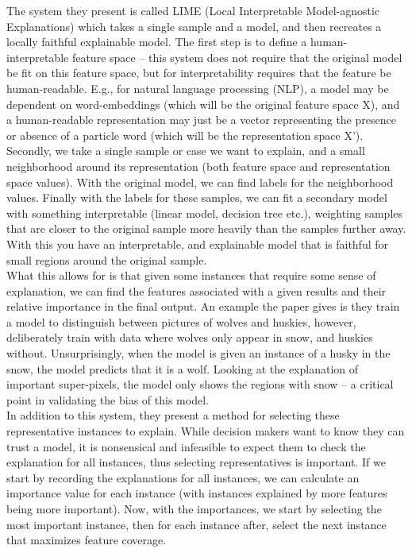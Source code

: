 \documentclass[a4paper]{article}
\begin{document}
\vspace{0.5cm}

The system they present is called LIME (Local Interpretable Model-agnostic Explanations) which takes a single sample and a model, and then recreates a locally faithful explainable model. The first step is to define a human-interpretable feature space – this system does not require that the original model be fit on this feature space, but for interpretability requires that the feature be human-readable. E.g., for natural language processing (NLP), a model may be dependent on word-embeddings (which will be the original feature space X), and a human-readable representation may just be a vector representing the presence or absence of a particle word (which will be the representation space X’). Secondly, we take a single sample or case we want to explain, and a small neighborhood around its representation (both feature space and representation space values). With the original model, we can find labels for the neighborhood values. Finally with the labels for these samples, we can fit a secondary model with something interpretable (linear model, decision tree etc.), weighting samples that are closer to the original sample more heavily than the samples further away. With this you have an interpretable, and explainable model that is faithful for small regions around the original sample. \\

What this allows for is that given some instances that require some sense of explanation, we can find the features associated with a given results and their relative importance in the final output. An example the paper gives is they train a model to distinguish between pictures of wolves and huskies, however, deliberately train with data where wolves only appear in snow, and huskies without. Unsurprisingly, when the model is given an instance of a husky in the snow, the model predicts that it is a wolf. Looking at the explanation of important super-pixels, the model only shows the regions with snow – a critical point in validating the bias of this model. \\

In addition to this system, they present a method for selecting these representative instances to explain. While decision makers want to know they can trust a model, it is nonsensical and infeasible to expect them to check the explanation for all instances, thus selecting representatives is important. If we start by recording the explanations for all instances, we can calculate an importance value for each instance (with instances explained by more features being more important). Now, with the importances, we start by selecting the most important instance, then for each instance after, select the next instance that maximizes feature coverage. \\
\end{document}
